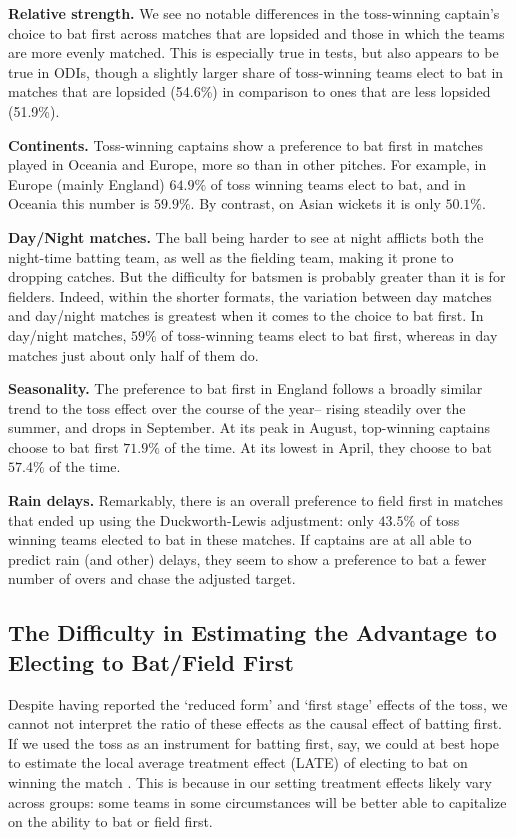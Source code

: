 \documentclass[11pt,  letterpaper]{article}
\begin{document}
\textbf{Relative strength.} We see no notable differences in the toss-winning captain's choice to bat first across matches that are lopsided and those in which the teams are more evenly matched. This is especially true in tests, but also appears to be true in ODIs, though a slightly larger share of toss-winning teams elect to bat in matches that are lopsided (54.6\%) in comparison to ones that are less lopsided (51.9\%).

\textbf{Continents.} Toss-winning captains show a preference to bat first in matches played in Oceania and Europe, more so than in other pitches. For example, in Europe (mainly England) $64.9\%$ of toss winning teams elect to bat, and in Oceania this number is $59.9\%$. By contrast, on Asian wickets it is only $50.1\%$. 

\textbf{Day/Night matches.} The ball being harder to see at night afflicts both the night-time batting team, as well as the fielding team, making it prone to dropping catches. But the difficulty for batsmen is probably greater than it is for fielders. Indeed, within the shorter formats, the variation between day matches and day/night matches is greatest when it comes to the choice to bat first. In day/night matches, $59\%$ of toss-winning teams elect to bat first, whereas in day matches just about only half of them do. 

\textbf{Seasonality.} The preference to bat first in England follows a broadly similar trend to the toss effect over the course of the year-- rising steadily over the summer, and drops in September. At its peak in August, top-winning captains choose to bat first $71.9\%$ of the time. At its lowest in April, they choose to bat $57.4\%$ of the time.

\textbf{Rain delays.} Remarkably, there is an overall preference to field first in matches that ended up using the Duckworth-Lewis adjustment: only $43.5\%$ of toss winning teams elected to bat in these matches. If captains are at all able to predict rain (and other) delays, they seem to show a preference to bat a fewer number of overs and chase the adjusted target. 

\subsection{The Difficulty in Estimating the Advantage to Electing to Bat/Field First}

Despite having reported the `reduced form' and `first stage' effects of the toss, we cannot not interpret the ratio of these effects as the causal effect of batting first. If we used the toss as an instrument for batting first, say, we could at best hope to estimate the local average treatment effect (LATE) of electing to bat on winning the match \citep{angrist1996identification}. This is because in our setting  treatment effects likely vary across groups: some teams in some circumstances will be better able to capitalize on the ability to bat or field first.  
\end{document}
